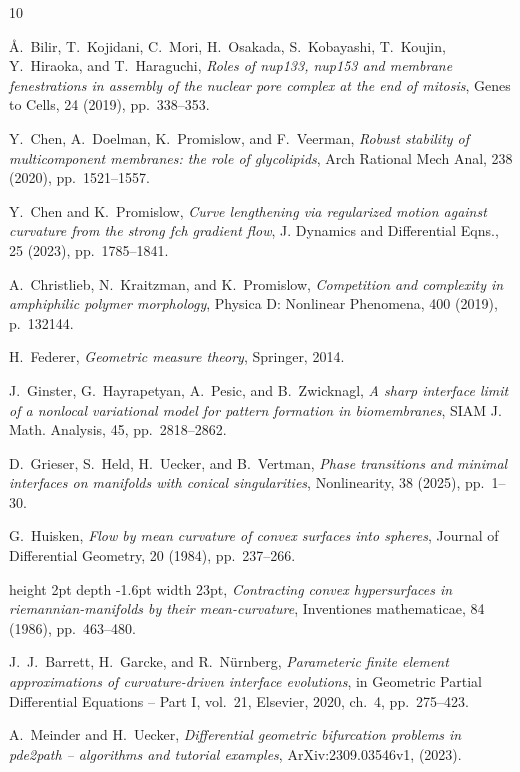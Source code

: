 \documentclass[11pt]{amsart}
\theoremstyle{plain}
\numberwithin{equation}{section}
\theoremstyle{plain}
\begin{document}

\begin{thebibliography}{10}

{\sc Å.~Bilir, T.~Kojidani, C.~Mori, H.~Osakada, S.~Kobayashi, T.~Koujin, Y.~Hiraoka, and T.~Haraguchi}, {\em Roles of nup133, nup153 and membrane fenestrations in assembly of the nuclear pore complex at the end of mitosis}, Genes to Cells, 24 (2019), pp.~338--353.

{\sc Y.~Chen, A.~Doelman, K.~Promislow, and F.~Veerman}, {\em Robust stability of multicomponent membranes: the role of glycolipids}, Arch Rational Mech Anal, 238 (2020), pp.~1521--1557.

{\sc Y.~Chen and K.~Promislow}, {\em Curve lengthening via regularized motion against curvature from the strong fch gradient flow}, J. Dynamics and Differential Eqns., 25 (2023), pp.~1785--1841.

{\sc A.~Christlieb, N.~Kraitzman, and K.~Promislow}, {\em Competition and complexity in amphiphilic polymer morphology}, Physica D: Nonlinear Phenomena, 400 (2019), p.~132144.

{\sc H.~Federer}, {\em Geometric measure theory}, Springer, 2014.

{\sc J.~Ginster, G.~Hayrapetyan, A.~Pesic, and B.~Zwicknagl}, {\em A sharp interface limit of a nonlocal variational model for pattern formation in biomembranes}, SIAM J. Math. Analysis, 45, pp.~2818--2862.

{\sc D.~Grieser, S.~Held, H.~Uecker, and B.~Vertman}, {\em Phase transitions and minimal interfaces on manifolds with conical singularities}, Nonlinearity, 38 (2025), pp.~1--30.

{\sc G.~Huisken}, {\em Flow by mean curvature of convex surfaces into spheres}, Journal of Differential Geometry, 20 (1984), pp.~237--266.

\leavevmode\vrule height 2pt depth -1.6pt width 23pt, {\em Contracting convex hypersurfaces in riemannian-manifolds by their mean-curvature}, Inventiones mathematicae, 84 (1986), pp.~463--480.

{\sc J.~J.~Barrett, H.~Garcke, and R.~N\"urnberg}, {\em Parameteric finite element approximations of curvature-driven interface evolutions}, in Geometric Partial Differential Equations -- Part I, vol.~21, Elsevier, 2020, ch.~4, pp.~275--423.

{\sc A.~Meinder and H.~Uecker}, {\em Differential geometric bifurcation problems in pde2path -- algorithms and tutorial examples}, ArXiv:2309.03546v1,  (2023).


\end{thebibliography}
\end{document}

